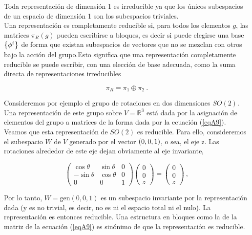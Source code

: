 Toda representación de dimensión 1 es irreducible ya que los únicos subespacios de un espacio de dimensión 1 son los subespacios triviales.\\

Una representación es completamente reducible si, para todos los elementos $g$, las matrices $\pi_{R}(g)$ pueden escribirse a bloques, es decir si puede elegirse una base $\qty{\phi^{i}}$ de forma que existan subespacios de vectores que no se mezclan con otros bajo la acción del grupo.Esto significa que una representación completamente reducible se puede escribir, con una elección de base adecuada, como la suma directa de representaciones irreducibles

\begin{equation*}
    \pi_{R} = \pi_{1} \oplus \pi_{2}~. 
\end{equation*}

Consideremos por ejemplo el grupo de rotaciones en dos dimensiones $SO(2)$. Una representación de este grupo sobre $V = \mathbb{R}^{3}$ está dada por la asignación de elementos del grupo a matrices de la forma dada por la ecuación (\ref{eqA9}). Veamos que esta representación de $SO(2)$ es reducible. Para ello, consideremos el subespacio $W$ de $V$ generado por el vector $\qty(0,0,1)$, o sea, el eje z. Las rotaciones alrededor de este eje dejan obviamente al eje invariante,

\begin{equation*}
\left( 
\begin{array}{ccc}
\cos \theta  & \sin \theta  & 0 \\ 
-\sin \theta  & \cos \theta  & 0 \\ 
0 & 0 & 1%
\end{array}%
\right) \left( 
\begin{array}{c}
0 \\ 
0 \\ 
z%
\end{array}%
\right) =\left( 
\begin{array}{c}
0 \\ 
0 \\ 
z
\end{array}
\right) ~,
\end{equation*}

Por lo tanto, $W = \text{gen}(0,0,1)$ es un subespacio invariante por la representación dada (y es no trivial, es decir, no es ni el espacio total ni el nulo). La representación es entonces reducible. Una estructura en bloques como la de la matriz de la ecuación (\ref{eqA9}) es sinónimo de que la representación
es reducible.\\

